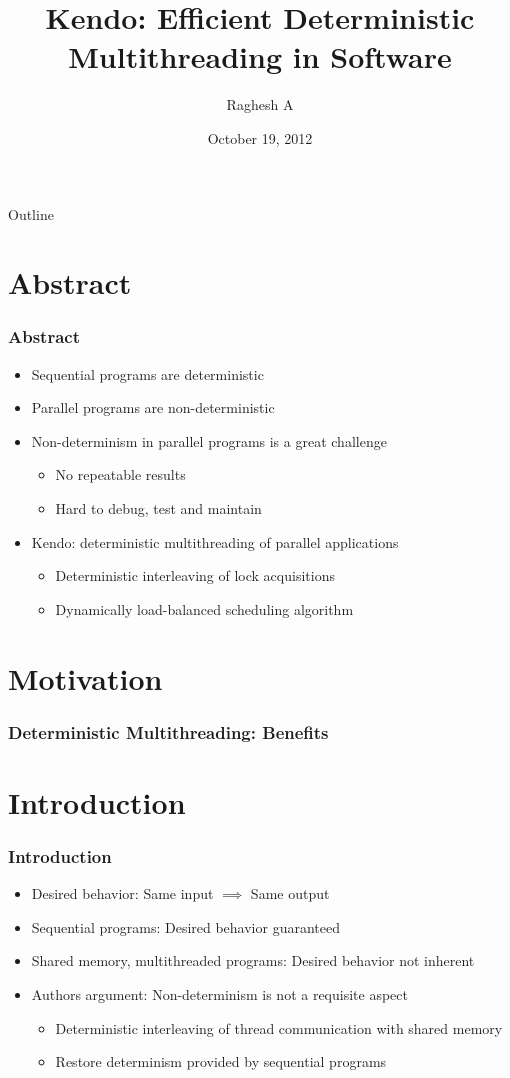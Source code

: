 \documentclass{beamer}
\title[Kendo]{Kendo: Efficient Deterministic Multithreading in Software}
\author{Raghesh A}
\institute[CSE IIT Madras]
{
  IIT Madras\\
  \medskip
  {\emph{raghesh@cse.iitm.ac.in}}
}
\date{October 19, 2012}
\begin{document}
\begin{frame}
\titlepage
\end{frame}

\begin{frame}{Outline}
\tableofcontents
\end{frame}

\section{Abstract}
\begin{frame}
\frametitle{Abstract}
\begin{itemize}
\item Sequential programs are deterministic
\item Parallel programs are non-deterministic
\item Non-determinism in parallel programs is a great challenge
\begin{itemize}
  \item No repeatable results
  \item Hard to debug, test and maintain
\end{itemize}
\item Kendo: deterministic multithreading of parallel applications
\begin{itemize}
  \item Deterministic interleaving of lock acquisitions
  \item Dynamically load-balanced scheduling algorithm
\end{itemize}
\end{itemize}
\end{frame}

\section{Motivation}
\begin{frame}
\frametitle{Deterministic Multithreading: Benefits}
\end{frame}

\section{Introduction}
\begin{frame}
\frametitle{Introduction}
\begin{itemize}
\item Desired behavior: Same input $\implies$ Same output
\item Sequential programs: Desired behavior guaranteed
\item Shared memory, multithreaded programs: Desired behavior not inherent
\item Authors argument: Non-determinism is not a requisite aspect
\begin{itemize}
\item Deterministic interleaving of thread communication with shared memory
\item Restore determinism provided by sequential programs
\end{itemize}
\end{itemize}
\end{frame}
\end{document}
